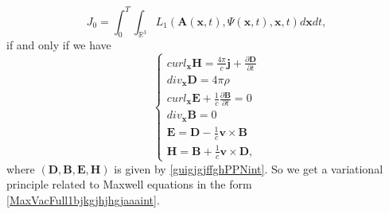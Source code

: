 \documentclass{article}
\theoremstyle{definition}
\theoremstyle{remark}
\renewcommand{\vec}[1]{\mathbf{#1}}
\newcommand{\er}{\eqref}
\newcommand{\er}{\eqref}
\begin{document}
\begin{equation}\label{btfffygtgyggyPPNint}
J_0=\int_0^T\int_{\mathbb{R}^3}L_1\left(\vec A(\vec x,t),\Psi(\vec
x,t),\vec x,t\right)d\vec x dt,
\end{equation}
if and only if we have
\begin{equation}\label{guigjgjffghguygjyfPPNint}
\begin{cases}
curl_{\vec x}\vec H=\frac{4\pi}{c}\vec j+\frac{\partial\vec
D}{\partial
t}\\
div_{\vec x}\vec D=4\pi\rho\\
curl_{\vec x}\vec E+\frac{1}{c}\frac{\partial\vec B}{\partial t}=0\\
div_{\vec x}\vec B=0\\
\vec E=\vec D-\frac{1}{c}\vec v\times\vec B\\
\vec H=\vec B+\frac{1}{c}\vec v\times\vec D,
\end{cases}
\end{equation}
where $(\vec D,\vec B,\vec E,\vec H)$ is given by
\er{guigjgjffghPPNint}. So we get a variational principle related to
Maxwell equations in the form \er{MaxVacFull1bjkgjhjhgjaaaint}.
\end{document}
